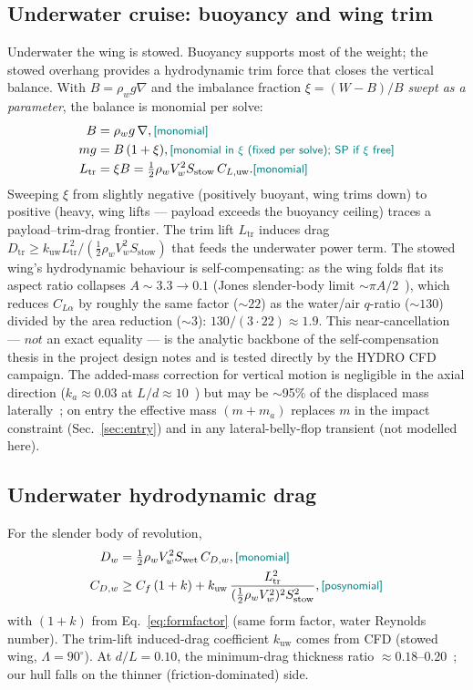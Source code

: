 \documentclass{new-aiaa}
\newcommand{\gpc}[1]{\textcolor{teal}{\small\textsf{[#1]}}} %
\begin{document}
\subsection{Underwater cruise: buoyancy and wing trim}\label{sec:buoyancy}
Underwater the wing is stowed. Buoyancy supports most of the weight; the stowed overhang provides a
hydrodynamic trim force that closes the vertical balance. With $B=\rho_w g\nabla$ and the imbalance
fraction $\xi=(W-B)/B$ \emph{swept as a parameter}, the balance is monomial per solve:
\begin{align}
B   &= \rho_w g\, \nabla, \gpc{monomial}\\
m g &= B\,(1+\xi),        \gpc{monomial in $\xi$ (fixed per solve); SP if $\xi$ free}\\
L_{\text{tr}} &= \xi B = \tfrac12\rho_w V_w^2 S_{\text{stow}}\,C_{L,\text{uw}}. \gpc{monomial}
\end{align}
Sweeping $\xi$ from slightly negative (positively buoyant, wing trims down) to positive (heavy,
wing lifts — payload exceeds the buoyancy ceiling) traces a payload--trim-drag frontier. The trim
lift $L_{\text{tr}}$ induces drag $D_{\text{tr}}\ge k_{\text{uw}} L_{\text{tr}}^2/
(\tfrac12\rho_w V_w^2 S_{\text{stow}})$ that feeds the underwater power term.
The stowed wing's hydrodynamic behaviour is self-compensating: as the wing folds flat its aspect
ratio collapses $A\sim3.3 \to 0.1$ (Jones slender-body limit $\sim\pi A/2$~\cite{hoerner1985fluid}),
which reduces $C_{L\alpha}$ by roughly the same factor ($\sim22$) as the water/air $q$-ratio
($\sim130$) divided by the area reduction ($\sim3$): $130/(3\cdot22)\approx1.9$. This
near-cancellation — $\textit{not}$ an exact equality — is the analytic backbone of the
self-compensation thesis in the project design notes and is tested directly by the HYDRO CFD campaign.
The added-mass correction for vertical motion is negligible in the axial direction
($k_a\approx0.03$ at $L/d\approx10$~\cite{newman2018marine}) but may be $\sim$95\% of the
displaced mass laterally~\cite{newman2018marine}; on entry the effective mass $(m+m_a)$ replaces
$m$ in the impact constraint (Sec.~\ref{sec:entry}) and in any lateral-belly-flop transient (not
modelled here).

\subsection{Underwater hydrodynamic drag}
For the slender body of revolution,
\begin{align}
D_w      &= \tfrac12\rho_w V_w^2 S_{\text{wet}}\,C_{D,w}, \gpc{monomial}\\
C_{D,w}  &\ge C_f\,(1+k) + k_{\text{uw}}\,
            \frac{L_{\text{tr}}^2}{(\tfrac12\rho_w V_w^2)^2 S_{\text{stow}}^2}, \gpc{posynomial}
\end{align}
with $(1+k)$ from Eq.~\eqref{eq:formfactor} (same form factor, water Reynolds number). The trim-lift
induced-drag coefficient $k_{\text{uw}}$ comes from CFD (stowed wing, $\Lambda=90^\circ$). At
$d/L=0.10$, the minimum-drag thickness ratio $\approx 0.18$--$0.20$~\cite{hoerner1965fluid}; our
hull falls on the thinner (friction-dominated) side.
\end{document}
